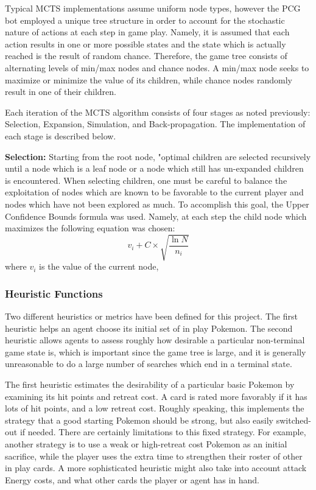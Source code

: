 \documentclass{article}
\begin{document}
Typical MCTS implementations assume uniform node types, however the PCG bot employed a unique tree structure in order to account for the stochastic nature of actions at each step in game play. Namely, it is assumed that each action results in one or more possible states and the state which is actually reached is the result of random chance. Therefore, the game tree consists of alternating levels of min/max nodes and chance nodes. A min/max node seeks to maximize or minimize the value of its children, while chance nodes randomly result in one of their children.

Each iteration of the MCTS algorithm consists of four stages as noted previously: Selection, Expansion, Simulation, and Back-propagation. The implementation of each stage is described below. 

\textbf{Selection:} Starting from the root node, "optimal
 children are selected recursively until a node which is a leaf node or a node which still has un-expanded children is encountered. When selecting children, one must be careful to balance the exploitation of nodes which are known to be favorable to the current player and nodes which have not been explored as much. To accomplish this goal, the Upper Confidence Bounds formula was used. Namely, at each step the child node which maximizes the following equation was chosen: $$v_i + C \times \sqrt{\frac{\ln N}{n_i}}$$ where $v_i$ is the value of the current node, 



\subsubsection{Heuristic Functions} %
Two different heuristics or metrics have been defined for this project.  The first heuristic helps an agent choose its initial set of in play Pokemon.  The second heuristic allows agents to assess roughly how desirable a particular non-terminal game state is, which is important since the game tree is large, and it is generally unreasonable to do a large number of searches which end in a terminal state.

The first heuristic estimates the desirability of a particular basic Pokemon by examining its hit points and retreat cost.  A card is rated more favorably if it has lots of hit points, and a low retreat cost.  Roughly speaking, this implements the strategy that a good starting Pokemon should be strong, but also easily switched-out if needed.  There are certainly limitations to this fixed strategy.  For example, another strategy is to use a weak or high-retreat cost Pokemon as an initial sacrifice, while the player uses the extra time to strengthen their roster of other in play cards.  A more sophisticated heuristic might also take into account attack Energy costs, and what other cards the player or agent has in hand.
\end{document}
